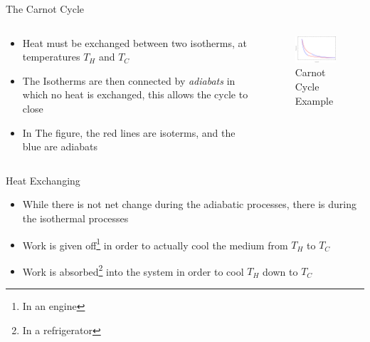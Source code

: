 \documentclass{beamer}
\begin{document}
\begin{frame}{The Carnot Cycle}
    \begin{columns}
    \begin{column}{0.5\textwidth}
      \begin{itemize}
      \item Heat must be exchanged between two isotherms, at temperatures $T_H$ and $T_C$
      \item The Isotherms are then connected by \textit{adiabats} in which no heat is exchanged, this allows the cycle to close
      \item In The figure, the red lines are isoterms, and the blue are adiabats
      \end{itemize}
    \end{column}
    \begin{column}{0.5\textwidth}
      \begin{figure}[H]
        \centering
        \includegraphics[width=5.0cm]{carnotcycle.png}
        \caption{Carnot Cycle Example}
      \end{figure}
    \end{column}
  \end{columns}  
\end{frame}

\begin{frame}{Heat Exchanging}
  \begin{itemize}
  \item While there is not net change during the adiabatic processes, there is during the isothermal processes
  \item Work is given off\footnote{In an engine} in order to actually cool the medium from $T_H$ to $T_C$
  \item Work is absorbed\footnote{In a refrigerator} into the system in order to cool $T_H$ down to $T_C$
  \end{itemize}
\end{frame}
\end{document}
